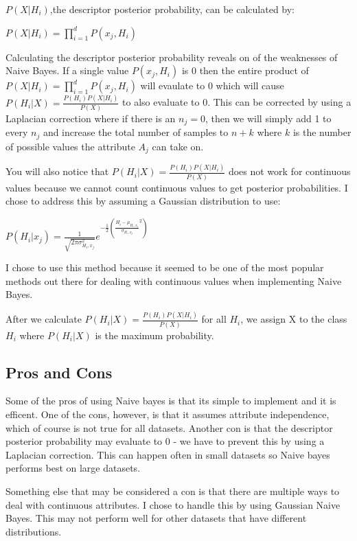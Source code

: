 \documentclass[paper=letter, fontsize=11pt]{article}
\numberwithin{equation}{section}		%
\numberwithin{figure}{section}			%
\numberwithin{table}{section}				%
\begin{document}
$P(X|H_i)$,the descriptor posterior probability, can be calculated by:

\begin{center} $P(X|H_i) = \prod_{i=1}^{d} P(x_j, H_i)$ \end{center}

\noindent Calculating the descriptor posterior probability reveals on of the weaknesses of Naive Bayes. If a single value $P(x_j, H_i)$ is 0 then the entire product of $P(X|H_i) = \prod_{i=1}^{d} P(x_j, H_i)$ will evaulate to 0 which will cause $P(H_i|X) = \frac{P(H_i)P(X|H_i)}{P(X)}$ to also evaluate to 0. This can be corrected by using a Laplacian correction where if there is an $n_j = 0$, then we will simply add 1 to every $n_j$ and increase the total number of samples to $n+k$ where $k$ is the number of possible values the attribute $A_j$ can take on. 

\noindent You will also notice that $P(H_i|X) = \frac{P(H_i)P(X|H_i)}{P(X)}$ does not work for continuous values because we cannot count continuous values to get posterior probabilities. I chose to address this by assuming a Gaussian distribution to use:

\begin{center} $P(H_i | x_j) = \frac{1}{\sqrt{2\pi\sigma_{H_i,x_j}^2}}e^{-\frac{1}{2}(\frac{H_i-\mu_{H_i,x_j}}{\sigma_{H_i,x_j}}^2)}$ \end{center}

\noindent I chose to use this method because it seemed to be one of the most popular methods out there for dealing with continuous values when implementing Naive Bayes. 

\noindent After we calculate $P(H_i|X) = \frac{P(H_i)P(X|H_i)}{P(X)}$ for all $H_i$, we assign X to the class $H_i$ where $P(H_i|X)$ is the maximum probability.

\subsection{Pros and Cons}
Some of the pros of using Naive bayes is that its simple to implement and it is efficent. One of the cons, however, is that it assumes attribute independence, which of course is not true for all datasets. Another con is that the descriptor posterior probability may evaluate to 0 - we have to prevent this by using a Laplacian correction. This can happen often in small datasets so Naive bayes performs best on large datasets. 

\noindent Something else that may be considered a con is that there are multiple ways to deal with continuous attributes. I chose to handle this by using Gaussian Naive Bayes. This may not perform well for other datasets that have different distributions. 
\end{document}
